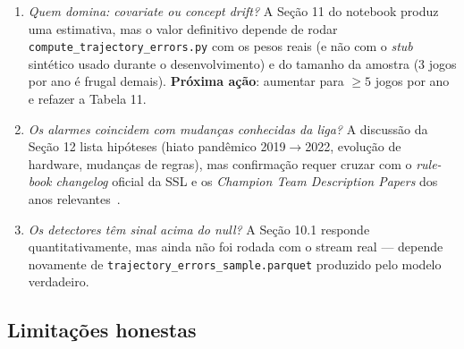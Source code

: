 \documentclass[11pt,a4paper]{article}
\begin{document}
\begin{enumerate}[leftmargin=1.6em,itemsep=2pt]
    \item \emph{Quem domina: covariate ou concept drift?}
          A Se\c{c}\~ao 11 do notebook produz uma estimativa, mas o valor
          definitivo depende de rodar
          \texttt{compute\_trajectory\_errors.py} com os pesos reais (e
          n\~ao com o \emph{stub} sint\'etico usado durante o
          desenvolvimento) e do tamanho da amostra (3 jogos por ano \'e
          frugal demais). \textbf{Pr\'oxima a\c{c}\~ao}: aumentar para
          $\geq 5$ jogos por ano e refazer a Tabela 11.
    \item \emph{Os alarmes coincidem com mudan\c{c}as conhecidas da
          liga?} A discuss\~ao da Se\c{c}\~ao 12 lista hip\'oteses
          (hiato pandêmico 2019$\to$2022, evolu\c{c}\~ao de hardware,
          mudan\c{c}as de regras), mas confirma\c{c}\~ao requer cruzar
          com o \emph{rule-book changelog} oficial da SSL e os
          \emph{Champion Team Description Papers} dos anos
          relevantes~\cite{rcssl_rules}.
    \item \emph{Os detectores t\^em sinal acima do null?} A Se\c{c}\~ao
          10.1 responde quantitativamente, mas ainda n\~ao foi rodada
          com o stream real --- depende novamente de
          \texttt{trajectory\_errors\_sample.parquet} produzido pelo
          modelo verdadeiro.
\end{enumerate}

\subsection{Limita\c{c}\~oes honestas}
\end{document}
